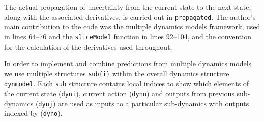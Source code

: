 The actual propagation of uncertainty from the current state to the next state, along with the associated derivatives, is carried out in \texttt{propagated}. The author's main contribution to the code was the multiple dynamics models framework, used in lines 64--76 and the \texttt{sliceModel} function in lines 92--104, and the convention for the calculation of the derivatives used throughout.




In order to implement and combine predictions from multiple dynamics models we use multiple structures \texttt{sub\{i\}} within the overall dynamics structure \texttt{dynmodel}. Each \texttt{sub} structure contains local indices to show which elements of the current state (\texttt{dyni}), current action (\texttt{dynu}) and outputs from previous sub-dynamics (\texttt{dynj}) are used as inputs to a particular sub-dynamics with outputs indexed by (\texttt{dyno}). 



